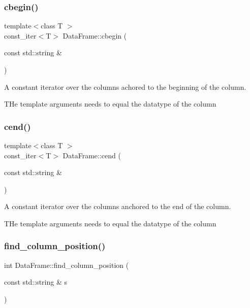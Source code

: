 \subsubsection{\texorpdfstring{cbegin()}{cbegin()}}
{\footnotesize\ttfamily template$<$class T $>$ \\
const\+\_\+iter$<$T$>$ Data\+Frame\+::cbegin (\begin{DoxyParamCaption}\item[{const std\+::string \&}]{ }\end{DoxyParamCaption})}



A constant iterator over the columns achored to the beginning of the column. 

T\+He template arguments needs to equal the datatype of the column \mbox{\label{classDataFrame_a895c45b1be67d772aed3fa10169a1038}} 
\subsubsection{\texorpdfstring{cend()}{cend()}}
{\footnotesize\ttfamily template$<$class T $>$ \\
const\+\_\+iter$<$T$>$ Data\+Frame\+::cend (\begin{DoxyParamCaption}\item[{const std\+::string \&}]{ }\end{DoxyParamCaption})}



A constant iterator over the columns anchored to the end of the column. 

T\+He template arguments needs to equal the datatype of the column \mbox{\label{classDataFrame_a24a13f1ad2e723ad048e1486d335191a}} 
\subsubsection{\texorpdfstring{find\+\_\+column\+\_\+position()}{find\_column\_position()}}
{\footnotesize\ttfamily int Data\+Frame\+::find\+\_\+column\+\_\+position (\begin{DoxyParamCaption}\item[{const std\+::string \&}]{s }\end{DoxyParamCaption})\hspace{0.3cm}{\ttfamily [private]}}



